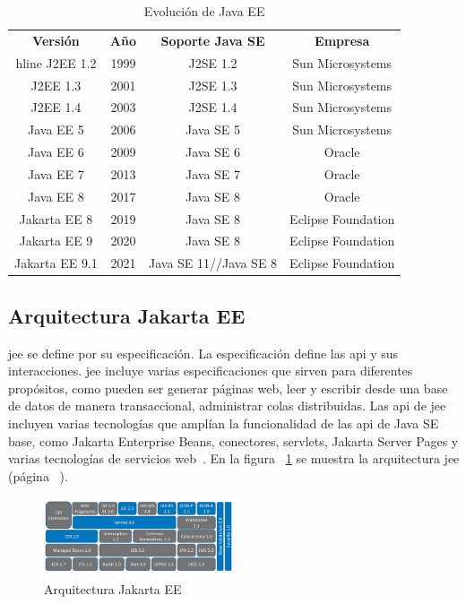\begin{table}[hp!]
  \centering
  \begin{tabular}{c|c|c|c}
  \rowcolor{udcpink!25}
  \textbf{Versión} & \textbf{Año} & \textbf{Soporte Java SE} & \textbf{Empresa} \\hline
J2EE 1.2 & 1999 & J2SE 1.2 & Sun Microsystems \\
J2EE 1.3 & 2001 & J2SE 1.3 & Sun Microsystems \\
J2EE 1.4 &2003 & J2SE 1.4 & Sun Microsystems \\
Java EE 5 & 2006 & Java SE 5 & Sun Microsystems \\
Java EE 6 & 2009 & Java SE 6 & Oracle \\
Java EE 7 & 2013 & Java SE 7 & Oracle \\
Java EE 8 & 2017 & Java SE 8 & Oracle \\
Jakarta EE 8 & 2019 & Java SE 8 & Eclipse Foundation \\
Jakarta EE 9 & 2020 & Java SE 8 & Eclipse Foundation \\
Jakarta EE 9.1 & 2021 & Java SE 11//Java SE 8 & Eclipse Foundation \\
  \end{tabular}
  \caption{Evolución de Java EE}
  \label{tab:evolucionJavaEE}
\end{table}



\subsection{Arquitectura Jakarta EE}
\label{sec:arquitectura}


\acrshort{jee} se define por su especificación. La especificación define las \acrfull{api} y sus interacciones. \acrshort{jee} incluye varias especificaciones que sirven para diferentes propósitos, como pueden ser generar páginas web, leer y escribir desde una base de datos de manera transaccional, administrar colas distribuidas. Las \acrshort{api} de \acrshort{jee} incluyen varias tecnologías que amplían la funcionalidad de las \acrshort{api} de Java SE base, como Jakarta Enterprise Beans, conectores, servlets, Jakarta Server Pages y varias tecnologías de servicios web~\cite{WikiJakartaEE-engl}. En la figura ~\ref{fig:arquitecturaJakartaEE} se muestra la arquitectura \acrshort{jee} (página ~\pageref{fig:arquitecturaJakartaEE})\cite{WikiJakartaEE-engl}.


\begin{figure}[hp!]
  \centering
  \includegraphics[width=0.50\textwidth]{imaxes/JakartaEE-Architecture.png}
  \caption{Arquitectura Jakarta EE}
  \label{fig:arquitecturaJakartaEE}
\end{figure}


